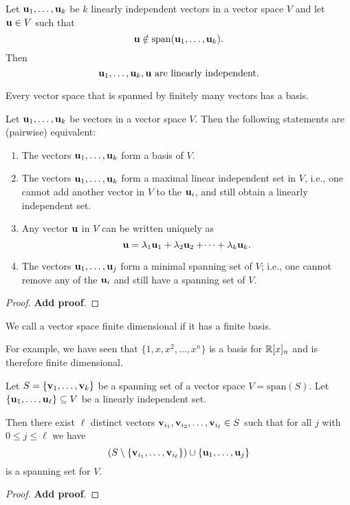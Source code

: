 \documentclass[10pt, a4paper]{article}
\begin{document}
\begin{lemma}\label{pre:linalg:lem:ifnotinspanofvecspacethenlinindep}
    Let $\mathbf{u}_1, \dotsc, \mathbf{u}_k$ be $k$ linearly independent vectors in a vector space $V$ and let $\mathbf{u} \in V$ such that
    \[
    \mathbf{u} \notin \mathrm{span}(\mathbf{u}_1, \dotsc, \mathbf{u}_k).
    \]
    Then
    \[
    \mathbf{u}_1, \dotsc, \mathbf{u}_k, \mathbf{u}\text{ are linearly independent}.
    \]
\end{lemma}

\begin{theorem}
    Every vector space that is spanned by finitely many vectors has a basis.
\end{theorem}

\begin{theorem}\label{pre:linalg:thm:whatisabasis}
    Let $\mathbf{u}_1, \dotsc, \mathbf{u}_k$ be vectors in a vector space $V$.
    Then the following statements are
    (pairwise)
    equivalent:
    \begin{enumerate}[label = (\roman*)]
        \item The vectors $\mathbf{u}_1, \dotsc, \mathbf{u}_k$ form a basis of $V$.
        \item The vectors $\mathbf{u}_1, \dotsc, \mathbf{u}_k$ form a maximal linear independent set in $V$,
        i.e., one cannot add another vector in $V$ to the $\mathbf{u}_i$,
        and still obtain a linearly independent set.
        \item Any vector $\mathbf{u}$ in $V$ can be written uniquely as
        \[
        \mathbf{u} = \lambda_1\mathbf{u}_1 + \lambda_2\mathbf{u}_2 + \dotsi + \lambda_k\mathbf{u}_k.
        \]
        \item The vectors $\mathbf{u}_1, \dotsc, \mathbf{u}_j$ form a minimal spanning set of $V$;
        i.e., one cannot remove any of the $\mathbf{u}_i$ and still have a spanning set of $V$.
    \end{enumerate}
    \begin{proof}
        \textbf{Add proof}.
    \end{proof}
\end{theorem}

We call a vector space finite dimensional if it has a finite basis.

For example,
we have seen that $\{1, x, x ^ 2, \dotsc, x ^ n\}$ is a basis for $\mathbb{R}[x]_n$ and is therefore finite dimensional.

\begin{theorem}
    Let $S = \{\mathbf{v}_1, \dotsc, \mathbf{v}_k\}$ be a spanning set of a vector space $V = \mathrm{span}(S)$.
    Let $\{\mathbf{u}_1, \dotsc, \mathbf{u}_{\ell}\} \subseteq V$ be a linearly independent set.

    Then there exist $\ell$ distinct vectors $\mathbf{v}_{i_1}, \mathbf{v}_{i_2}, \dotsc, \mathbf{v}_{i_{\ell}} \in S$ such that for all $j$ with $0 \leq j \leq \ell$ we have
    \[
    (S \setminus \{\mathbf{v}_{i_1}, \dotsc, \mathbf{v}_{i_{\ell}}\}) \cup \{\mathbf{u}_1, \dotsc, \mathbf{u}_j\}
    \]
    is a spanning set for $V$.
    \begin{proof}
        \textbf{Add proof}.
    \end{proof}
\end{theorem}
\end{document}
